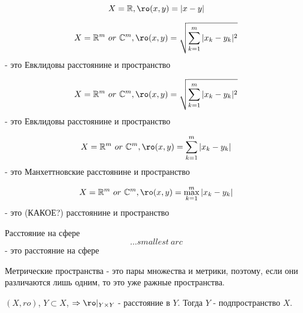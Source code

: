 \documentclass[12pt, a4paper]{article}
\begin{document}
  \begin{example}
  \begin{equation}
    X = \sR, \ro(x, y) = |x - y|
  \end{equation}
  \end{example}

  \begin{example}
  \begin{equation}
    X = \sR^m ~ or ~ \sC^m, \ro(x, y) = \sqrt{\sum_{k = 1}^{m} |x_k - y_k|^2}
  \end{equation} - это Евклидовы расстоянине и пространство
  \end{example}

  \begin{example}
  \begin{equation}
    X = \sR^m ~ or ~ \sC^m, \ro(x, y) = \sqrt{\sum_{k = 1}^{m} |x_k - y_k|^2}
  \end{equation} - это Евклидовы расстоянине и пространство
  \end{example}

  \begin{example}
  \begin{equation}
    X = \sR^m ~ or ~ \sC^m, \ro(x, y) = \sum_{k = 1}^{m} |x_k - y_k|
  \end{equation} - это Манхеттновские расстоянине и пространство
  \end{example}

  \begin{example}
  \begin{equation}
    X = \sR^m ~ or ~ \sC^m, \ro(x, y) = \max_{k = 1}^{m} |x_k - y_k|
  \end{equation} - это (КАКОЕ?) расстоянине и пространство
  \end{example}

  \begin{example}
  Расстояние на сфере
  \begin{equation}
    \dots smallest ~ arc
  \end{equation} - это расстояние на сфере
  \end{example}



  \begin{note}
  Метрические пространства - 
  это пары множества и метрики, 
  поэтому, если они различаются лишь одним, то это уже ражные пространства.
  \end{note}


  \begin{definition}
  [Подпространство]
  $(X, ro)$, $Y \subset X$, 
  $\Rightarrow \ro|_{Y \times Y}$ - расстояние в $Y$.
  Тогда $Y$ - подпространство $X$.
  \end{definition}
\end{document}
